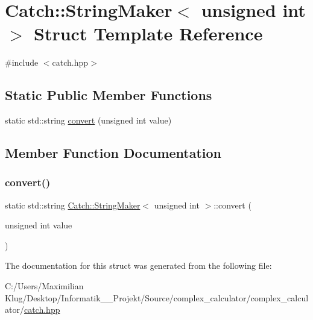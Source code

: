 \hypertarget{struct_catch_1_1_string_maker_3_01unsigned_01int_01_4}{}\section{Catch\+:\+:String\+Maker$<$ unsigned int $>$ Struct Template Reference}
\label{struct_catch_1_1_string_maker_3_01unsigned_01int_01_4}


{\ttfamily \#include $<$catch.\+hpp$>$}

\subsection*{Static Public Member Functions}
\begin{DoxyCompactItemize}
\item 
static std\+::string \mbox{\hyperlink{struct_catch_1_1_string_maker_3_01unsigned_01int_01_4_aa0ec816ef8a65664b0524d55d08e2fd9}{convert}} (unsigned int value)
\end{DoxyCompactItemize}


\subsection{Member Function Documentation}
\mbox{\label{struct_catch_1_1_string_maker_3_01unsigned_01int_01_4_aa0ec816ef8a65664b0524d55d08e2fd9}} 
\subsubsection{\texorpdfstring{convert()}{convert()}}
{\footnotesize\ttfamily static std\+::string \mbox{\hyperlink{struct_catch_1_1_string_maker}{Catch\+::\+String\+Maker}}$<$ unsigned int $>$\+::convert (\begin{DoxyParamCaption}\item[{unsigned int}]{value }\end{DoxyParamCaption})\hspace{0.3cm}{\ttfamily [static]}}



The documentation for this struct was generated from the following file\+:\begin{DoxyCompactItemize}
\item 
C\+:/\+Users/\+Maximilian Klug/\+Desktop/\+Informatik\+\_\+\_\+\+Projekt/\+Source/complex\+\_\+calculator/complex\+\_\+calculator/\mbox{\hyperlink{catch_8hpp}{catch.\+hpp}}\end{DoxyCompactItemize}
